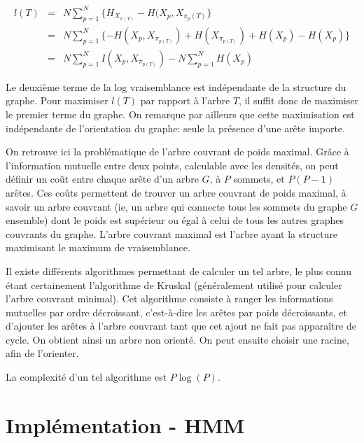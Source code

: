 \documentclass{article}
\begin{document}
\subsection{}

\begin{align}
l(T) & = & N \sum_{p=1}^N \{H_{X_{\pi(T)}} - H(X_p, X_{\pi_p(T)}\} \\
     & = & N \sum_{p=1}^N \{- H(X_p, X_{\pi_{p(T)}}) + H(X_{\pi_{p(T)}}) + H(X_p) - H(X_p)\} \\
     & = & N \sum_{p=1}^N I(X_p, X_{\pi_{p(T)}}) - N \sum_{p=1}^N H(X_p)
\end{align}


Le deuxième terme de la log vraisemblance est indépendante de la structure du
graphe. Pour maximiser $l(T)$ par rapport à l'arbre $T$, il suffit donc de
maximiser le premier terme du graphe. On remarque par ailleurs que cette
maximisation est indépendante de l'orientation du graphe: seule la présence
d'une arête importe.

On retrouve ici la problématique de l'arbre couvrant de poids maximal. Grâce à
l'information mutuelle entre deux points, calculable avec les densités, on peut
définir un coût entre chaque arête d'un arbre $G$, à $P$ sommets, et $P(P - 1)$
arêtes. Ces coûts permettent de trouver un arbre couvrant de poids maximal, à
savoir un arbre couvrant (ie, un arbre qui connecte tous les sommets du graphe
$G$ ensemble) dont le poids est supérieur ou égal à celui de tous les autres
graphes couvrants du graphe. L'arbre couvrant maximal est l'arbre ayant la
structure maximisant le maximum de vraisemblance.

Il existe différents algorithmes permettant de calculer un tel arbre, le plus
connu étant certainement l'algorithme de Kruskal (généralement utilisé pour
calculer l'arbre couvrant minimal). Cet algorithme consiste à ranger les
informations mutuelles par ordre décroissant, c'est-à-dire les arêtes par poids
décroissants, et d'ajouter les arêtes à l'arbre couvrant tant que cet ajout ne
fait pas apparaître de cycle. On obtient ainsi un arbre non orienté. On peut
ensuite choisir une racine, afin de l'orienter.

La complexité d'un tel algorithme est $P\log(P)$.

\section{Implémentation - HMM}
\end{document}
